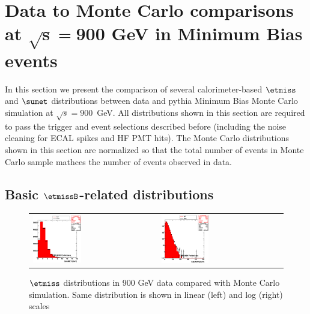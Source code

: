 \section{Data to Monte Carlo comparisons at $\boldsymbol{\sqrt{s}=900}$ GeV in
  Minimum Bias events}
\label{sc:DataVsMCMB900}

In this section we present the comparison of several calorimeter-based $\etmiss$ and $\sumet$
distributions between data and {\sc pythia} Minimum Bias Monte Carlo simulation at $\sqrt{s}=900$~GeV. 
All distributions shown in this section are required to pass the trigger and event selections
described before (including the noise cleaning for ECAL spikes and HF PMT hits). 
The Monte Carlo distributions shown in this section
are normalized so that the total number of events in Monte Carlo sample
mathces the number of events observed in data.

\subsection[Basic $\etmiss$-related distributions]{Basic $\etmissB$-related distributions}
\begin{figure}[h!]
 \centering
 \begin{tabular}{ll}
  \includegraphics[width=0.40\textwidth]{plots_DataVsMC_MB_900GeV/h_calometPt_lin.eps} &
  \includegraphics[width=0.40\textwidth]{plots_DataVsMC_MB_900GeV/h_calometPt.eps} \\
 \end{tabular}
 \caption{$\etmiss$ distributions in 900 GeV data compared
   with Monte Carlo simulation. Same distribution is shown in linear (left) and log (right) scales
          \label{fig:DataVsMC_MB_900_1}}
\end{figure}

